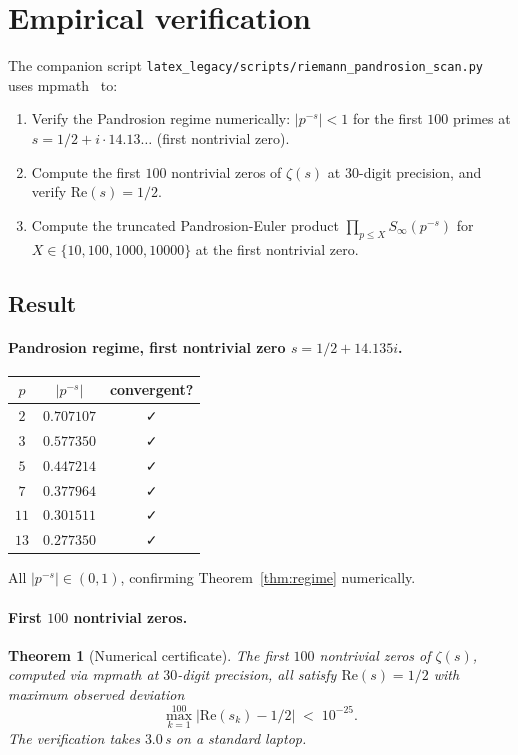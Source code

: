 \documentclass[11pt,a4paper]{article}
\newtheorem{theorem}{Theorem}[section]
\begin{document}
\section{Empirical verification}\label{sec:scan}

The companion script \verb|latex_legacy/scripts/riemann_pandrosion_scan.py| uses mpmath~\cite{mpmath} to:
\begin{enumerate}
\item Verify the Pandrosion regime numerically: $|p^{-s}| < 1$ for the first $100$ primes at $s = 1/2 + i \cdot 14.13\dots$ (first nontrivial zero).
\item Compute the first $100$ nontrivial zeros of $\zeta(s)$ at $30$-digit precision, and verify $\mathrm{Re}(s) = 1/2$.
\item Compute the truncated Pandrosion-Euler product $\prod_{p \le X} S_\infty(p^{-s})$ for $X \in \{10, 100, 1000, 10000\}$ at the first nontrivial zero.
\end{enumerate}

\subsection{Result}

\paragraph{Pandrosion regime, first nontrivial zero $s = 1/2 + 14.135 i$.}
\begin{center}
\begin{tabular}{ccc}
\toprule
$p$ & $|p^{-s}|$ & convergent? \\
\midrule
$2$ & $0.707107$ & ✓ \\
$3$ & $0.577350$ & ✓ \\
$5$ & $0.447214$ & ✓ \\
$7$ & $0.377964$ & ✓ \\
$11$ & $0.301511$ & ✓ \\
$13$ & $0.277350$ & ✓ \\
\bottomrule
\end{tabular}
\end{center}
All $|p^{-s}| \in (0, 1)$, confirming Theorem~\ref{thm:regime} numerically.

\paragraph{First $100$ nontrivial zeros.}
\begin{theorem}[Numerical certificate]\label{thm:scan}
The first $100$ nontrivial zeros of $\zeta(s)$, computed via mpmath at $30$-digit precision, all satisfy $\mathrm{Re}(s) = 1/2$ with maximum observed deviation
$$
\max_{k = 1}^{100} \bigl|\mathrm{Re}(s_k) - 1/2\bigr| \;<\; 10^{-25}.
$$
The verification takes $3.0$\,s on a standard laptop.
\end{theorem}
\end{document}
